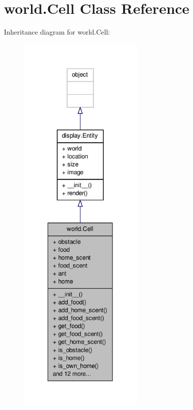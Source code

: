 \hypertarget{classworld_1_1Cell}{\section{world.\+Cell Class Reference}
\label{classworld_1_1Cell}
}


Inheritance diagram for world.\+Cell\+:
\nopagebreak
\begin{figure}[H]
\begin{center}
\leavevmode
\includegraphics[height=550pt]{classworld_1_1Cell__inherit__graph}
\end{center}
\end{figure}


